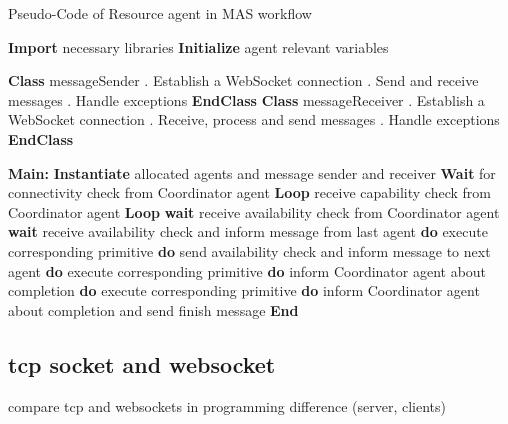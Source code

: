 \begin{algorithm}
    \caption{Pseudo-Code of Resource agent in MAS workflow}
    \label{alg:RAPseudoCode}
    \begin{algorithmic}
    \State \textbf{Import} necessary libraries
    \State \textbf{Initialize} agent relevant variables
    
    \State \textbf{Class} messageSender
        . Establish a WebSocket connection
        . Send and receive messages
        . Handle exceptions
        \EndProcedure
    \State \textbf{EndClass}
    \State \textbf{Class} messageReceiver
        . Establish a WebSocket connection
        . Receive, process and send messages
        . Handle exceptions
        \EndProcedure
    \State \textbf{EndClass}

    
    \State \textbf{Main:}
    \State \textbf{Instantiate} allocated agents and message sender and receiver
    \State \textbf{Wait} for connectivity check from Coordinator agent
    \State \textbf{Loop} receive capability check from Coordinator agent
    \State \textbf{Loop} 
        \State \textbf{wait} receive availability check from Coordinator agent
    \Else
            \State \textbf{wait} receive availability check and inform message from last agent
            \State \textbf{do} execute corresponding primitive
            \EndIf
            \State \textbf{do} send availability check and inform message to next agent
            \State \textbf{do} execute corresponding primitive
            \State \textbf{do} inform Coordinator agent about completion
            \EndIf
            \State \textbf{do} execute corresponding primitive
            \State \textbf{do} inform Coordinator agent about completion and send finish message
        \EndIf
    \EndIf
    \State \textbf{End} 
    \end{algorithmic}
    \end{algorithm}

\subsection{tcp socket and websocket}
compare tcp and websockets in programming difference (server, clients)


